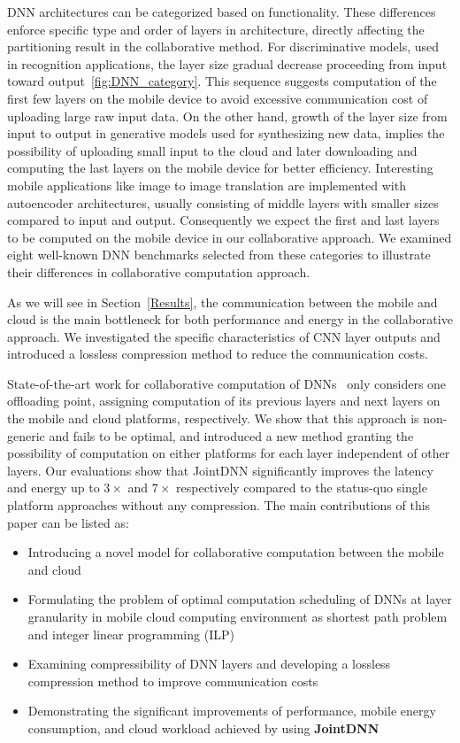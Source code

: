 DNN architectures can be categorized based on functionality. These differences enforce specific type and order of layers in architecture, directly affecting the partitioning result in the collaborative method. For discriminative models, used in recognition applications, the layer size gradual decrease proceeding from input toward output~\ref{fig:DNN_category}. This sequence suggests computation of the first few layers on the mobile device to avoid excessive communication cost of uploading large raw input data. On the other hand, growth of the layer size from input to output in generative models used for synthesizing new data, implies the possibility of uploading small input to the cloud and later downloading and computing the last layers on the mobile device for better efficiency. Interesting mobile applications like image to image translation are implemented with autoencoder architectures, usually consisting of middle layers with smaller sizes compared to input and output. Consequently we expect the first and last layers to be computed on the mobile device in our collaborative approach. We examined eight well-known DNN benchmarks selected from these categories to illustrate their differences in collaborative computation approach. 

As we will see in Section~\ref{Results}, the communication between the mobile and cloud is the main bottleneck for both performance and energy in the collaborative approach. We investigated the specific characteristics of CNN layer outputs and introduced a lossless compression method to reduce the communication costs. 

State-of-the-art work for collaborative computation of DNNs~\cite{Neurosurgeon} only considers one offloading point, assigning computation of its previous layers and next layers on the mobile and cloud platforms, respectively. We show that this approach is non-generic and fails to be optimal, and introduced a new method granting the possibility of computation on either platforms for each layer independent of other layers. Our evaluations show that JointDNN significantly improves the latency and energy up to $3\times$ and $7\times$ respectively compared to the status-quo single platform approaches without any compression. The main contributions of this paper can be listed as:

\begin{itemize}
\item Introducing a novel model for collaborative computation between the mobile and cloud 
\item Formulating the problem of optimal computation scheduling of DNNs at layer granularity in mobile cloud computing environment as shortest path problem and integer linear programming (ILP) 
\item Examining compressibility of DNN layers and developing a lossless compression method to improve communication costs
\item Demonstrating the significant improvements of performance, mobile energy consumption, and cloud workload achieved by using \textbf{JointDNN}
\end{itemize}

